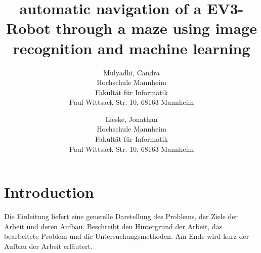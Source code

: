 \documentclass[conference,compsoc,final,a4paper]{IEEEtran}
\newcommand{\dokumententitel}[0]{automatic navigation of a EV3-Robot through a maze using image recognition and machine learning}
\begin{document}
\title{\dokumententitel}

\author{
    Mulyadhi, Candra \\
    Hochschule Mannheim\\
    Fakultät für Informatik\\
    Paul-Wittsack-Str. 10,
    68163 Mannheim
    \and
    Lieske, Jonathan \\
    Hochschule Mannheim\\
    Fakultät für Informatik\\
    Paul-Wittsack-Str. 10,
    68163 Mannheim

}

\maketitle
\thispagestyle{plain}
\pagestyle{plain}


\begin{abstract}

\end{abstract}

{\small\tableofcontents}

\section{Introduction}\label{introduction}
Die Einleitung liefert eine generelle Darstellung des Problems, der Ziele der Arbeit und deren Aufbau. Beschreibt den Hintergrund der Arbeit, das bearbeitete Problem und die Untersuchungsmethoden. Am Ende wird kurz der Aufbau der Arbeit erläutert.
\end{document}
